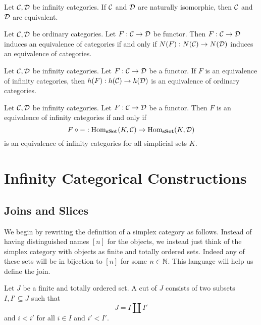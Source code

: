 \documentclass[a4paper]{article}
\begin{document}
\begin{lmm}{}{} Let $\mathcal{C},\mathcal{D}$ be infinity categories. If $\mathcal{C}$ and $\mathcal{D}$ are naturally isomorphic, then $\mathcal{C}$ and $\mathcal{D}$ are equivalent. 
\end{lmm}

\begin{prp}{}{} Let $\mathcal{C},\mathcal{D}$ be ordinary categories. Let $F:\mathcal{C}\to\mathcal{D}$ be functor. Then $F:\mathcal{C}\to\mathcal{D}$ induces an equivalence of categories if and only if $N(F):N(\mathcal{C})\to N(\mathcal{D})$ induces an equivalence of categories. 
\end{prp}

\begin{prp}{}{} Let $\mathcal{C},\mathcal{D}$ be infinity categories. Let $F:\mathcal{C}\to\mathcal{D}$ be a functor. If $F$ is an equivalence of infinity categories, then $h(F):h(\mathcal{C})\to h(\mathcal{D})$ is an equivalence of ordinary categories. 
\end{prp}

\begin{prp}{}{} Let $\mathcal{C},\mathcal{D}$ be infinity categories. Let $F:\mathcal{C}\to\mathcal{D}$ be a functor. Then $F$ is an equivalence of infinity categories if and only if $$F\circ -:\operatorname{Hom}_\bold{sSet}(K,\mathcal{C})\to\operatorname{Hom}_\bold{sSet}(K,\mathcal{D})$$ is an equivalence of infinity categories for all simplicial sets $K$. 
\end{prp}

\pagebreak
\section{Infinity Categorical Constructions}
\subsection{Joins and Slices}
We begin by rewriting the definition of a simplex category as follows. Instead of having distinguished names $[n]$ for the objects, we instead just think of the simplex category with objects as finite and totally ordered sets. Indeed any of these sets will be in bijection to $[n]$ for some $n\in\mathbb{N}$. This language will help us define the join. 

\begin{defn}{}{} Let $J$ be a finite and totally ordered set. A cut of $J$ consists of two subsets $I,I'\subseteq J$ such that $$J=I\amalg I'$$ and $i<i'$ for all $i\in I$ and $i'<I'$. 
\end{defn}
\end{document}
